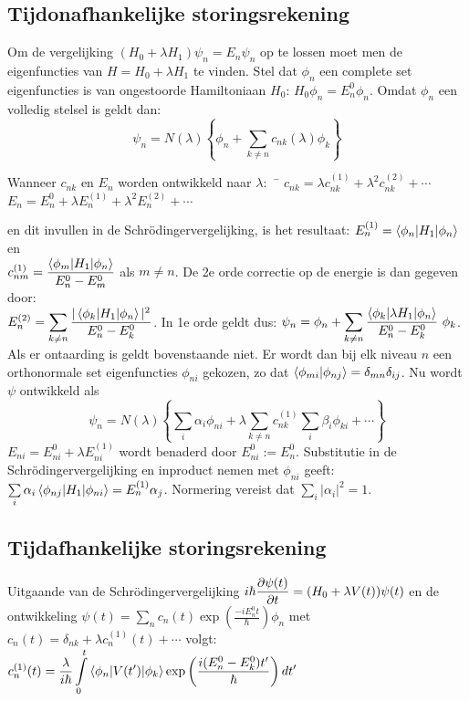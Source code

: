 \documentclass[twoside]{report}
\begin{document}
\subsection[~~Tijdonafhankelijke storingsrekening]{Tijdonafhankelijke storingsrekening}
Om de vergelijking $(H_0+\lambda H_1)\psi_n=E_n\psi_n$ op te lossen moet men
de eigenfuncties van $H=H_0+\lambda H_1$ te vinden. Stel dat $\phi_n$ een
complete set eigenfuncties is van ongestoorde Hamiltoniaan $H_0$:
$H_0\phi_n=E_n^0\phi_n$. Omdat $\phi_n$ een volledig stelsel is geldt dan:
\[
\psi_n=N(\lambda)\left\{\phi_n+\sum_{k\neq n}c_{nk}(\lambda)\phi_k\right\}
\]
\begin{tabbing}
Wanneer $c_{nk}$ en $E_n$ worden ontwikkeld naar $\lambda$:~~\=
$c_{nk}=\lambda c_{nk}^{(1)}+\lambda^2 c_{nk}^{(2)}+\cdots$\\
\>$E_n=E_n^0+\lambda E_n^{(1)}+\lambda^2 E_n^{(2)}+\cdots$
\end{tabbing}
en dit invullen in de Schr\"odingervergelijking, is het resultaat:
$E_n^{(1)}=\left\langle \phi_n|H_1|\phi_n \right\rangle$ en\\
$\displaystyle c_{nm}^{(1)}=\frac{\left\langle \phi_m|H_1|\phi_n \right\rangle}{E_n^0-E_m^0}$
als $m\neq n$. De 2e orde correctie op de energie is dan gegeven door:\\
$\displaystyle E^{(2)}_n=\sum_{k\neq n}\frac{|\left\langle \phi_k|H_1|\phi_n \right\rangle|^2}{E^0_n-E^0_k}$.
In 1e orde geldt dus: $\displaystyle\psi_n=\phi_n+\sum_{k\neq n}
\frac{\left\langle \phi_k|\lambda H_1|\phi_n \right\rangle}{E_n^0-E_k^0}~\phi_k$.
\npar
Als er ontaarding is geldt bovenstaande niet. Er wordt dan bij elk niveau $n$
een orthonormale set eigenfuncties $\phi_{ni}$ gekozen, zo dat
$\left\langle \phi_{mi}|\phi_{nj} \right\rangle=\delta_{mn}\delta_{ij}$. Nu wordt $\psi$ ontwikkeld
als
\[
\psi_n=N(\lambda)\left\{\sum_i\alpha_i\phi_{ni}+\lambda\sum_{k\neq n}
c_{nk}^{(1)}\sum_i\beta_i\phi_{ki}+\cdots\right\}
\]
$E_{ni}=E_{ni}^0+\lambda E_{ni}^{(1)}$ wordt benaderd door $E_{ni}^0:=E_n^0$.
Substitutie in de Schr\"odingervergelijking en inproduct nemen met $\phi_{ni}$
geeft: $\sum\limits_i\alpha_i\left\langle \phi_{nj}|H_1|\phi_{ni} \right\rangle=E_n^{(1)}\alpha_j$.
Normering vereist dat $\sum\limits_i|\alpha_i|^2=1$.

\subsection[~~Tijdafhankelijke storingsrekening]{Tijdafhankelijke storingsrekening}
Uitgaande van de Schr\"odingervergelijking
$\displaystyle i\hbar\frac{\partial \psi(t)}{\partial t}=(H_0+\lambda V(t))\psi(t)$
\npar
en de ontwikkeling
$\displaystyle\psi(t)=\sum_nc_n(t)\exp\left(\frac{-iE_n^0t}{\hbar}\right)\phi_n$
met $c_n(t)=\delta_{nk}+\lambda c_n^{(1)}(t)+\cdots$
\npar
volgt: $\displaystyle
c_n^{(1)}(t)=\frac{\lambda}{i\hbar}\int\limits_0^t\left\langle \phi_n|V(t')|\phi_k \right\rangle
\exp\left(\frac{i(E_n^0-E_k^0)t'}{\hbar}\right)dt'$
\end{document}
